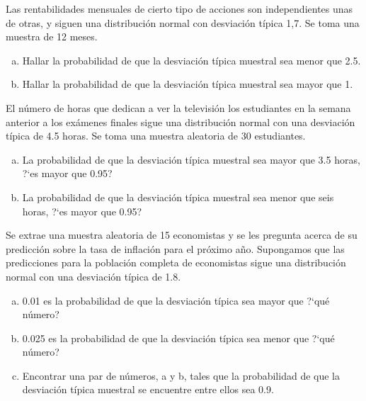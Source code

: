 \documentclass[12pt]{article}
\begin{document}
        \begin{prob} Las rentabilidades mensuales de cierto tipo de
        acciones son independientes unas de otras, y siguen una
        distribución normal con desviación típica 1,7. Se toma una
        muestra de 12 meses.
        \begin{enumerate}[a)]
            \item Hallar la probabilidad de que la desviación típica muestral
            sea menor que 2.5.
            \item Hallar la probabilidad de que la desviación típica
            muestral sea mayor que 1.
            \end{enumerate}
            \end{prob}

        \begin{prob} El número de horas que dedican a ver la televisión
        los estudiantes en la semana anterior a los exámenes finales
        sigue una distribución normal con una desviación típica de 4.5
        horas. Se toma una muestra aleatoria de 30 estudiantes.

        \begin{enumerate}[a)]
            \item La probabilidad  de que la desviación típica muestral sea
            mayor que 3.5 horas, ?`es mayor que 0.95?
            \item La probabilidad de que la desviación típica muestral sea
            menor que seis horas, ?`es mayor que 0.95?
            \end{enumerate}
            \end{prob}
                \begin{prob} Se extrae una muestra aleatoria de 15 economistas
                    y se les pregunta acerca de su predicción sobre la tasa de
                    inflación para el próximo año. Supongamos que las predicciones
                    para la población completa de economistas sigue una
                    distribución normal con una desviación típica de 1.8.
                \begin{enumerate}[a)]
            \item 0.01 es la probabilidad de que la desviación típica sea
            mayor que ?`qué número?
            \item 0.025 es la probabilidad de que la desviación típica sea
            menor que ?`qué número?
            \item Encontrar una par de números, a y b, tales que la
            probabilidad de que la desviación típica muestral se encuentre
            entre ellos sea 0.9.
            \end{enumerate}
            \end{prob}
\end{document}
